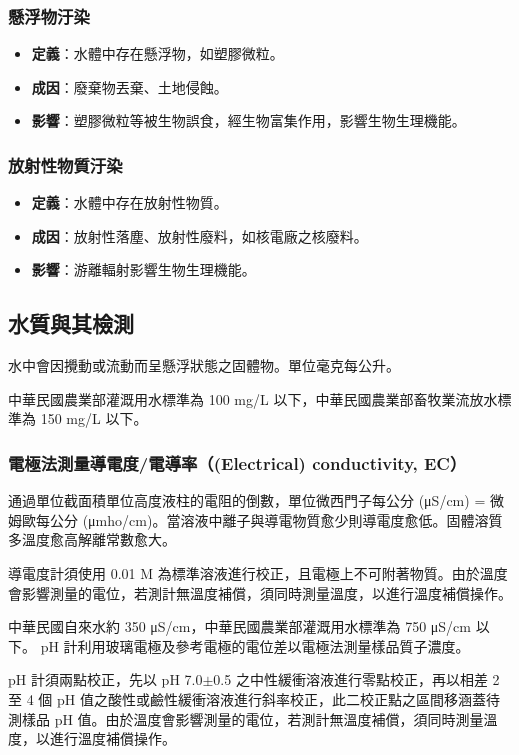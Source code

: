 \documentclass[a4paper,12pt]{report}
\begin{document}
\begin{itemize}
\subsubsection{懸浮物汙染}
\begin{itemize}
    \item \textbf{定義}：水體中存在懸浮物，如塑膠微粒。
    \item \textbf{成因}：廢棄物丟棄、土地侵蝕。
    \item \textbf{影響}：塑膠微粒等被生物誤食，經生物富集作用，影響生物生理機能。
\end{itemize}
\subsubsection{放射性物質汙染}
\begin{itemize}
\item \textbf{定義}：水體中存在放射性物質。
\item \textbf{成因}：放射性落塵、放射性廢料，如核電廠之核廢料。
\item \textbf{影響}：游離輻射影響生物生理機能。
\end{itemize}
\subsection{水質與其檢測}
水中會因攪動或流動而呈懸浮狀態之固體物。單位毫克每公升。

中華民國農業部灌溉用水標準為 100 mg/L 以下，中華民國農業部畜牧業流放水標準為 150 mg/L 以下。
\subsubsection{電極法測量導電度/電導率（(Electrical) conductivity, EC）}
通過單位截面積單位高度液柱的電阻的倒數，單位微西門子每公分 (μS/cm) = 微姆歐每公分 (μmho/cm)。當溶液中離子與導電物質愈少則導電度愈低。固體溶質多溫度愈高解離常數愈大。

導電度計須使用 0.01 M  為標準溶液進行校正，且電極上不可附著物質。由於溫度會影響測量的電位，若測計無溫度補償，須同時測量溫度，以進行溫度補償操作。

中華民國自來水約 350 μS/cm，中華民國農業部灌溉用水標準為 750 μS/cm 以下。
pH 計利用玻璃電極及參考電極的電位差以電極法測量樣品質子濃度。

pH 計須兩點校正，先以 pH 7.0$\pm$0.5 之中性緩衝溶液進行零點校正，再以相差 2 至 4 個 pH 值之酸性或鹼性緩衝溶液進行斜率校正，此二校正點之區間移涵蓋待測樣品 pH 值。由於溫度會影響測量的電位，若測計無溫度補償，須同時測量溫度，以進行溫度補償操作。

\end{itemize}
\end{document}
